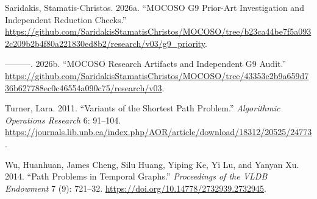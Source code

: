 \documentclass[
  11pt,
  letterpaper,
]{article}
\newlength{\cslhangindent}
\newlength{\cslentryspacingunit} %
\newenvironment{CSLReferences}[2] %
 {%
  \setlength{\parindent}{0pt}
  \ifodd #1
  \let\oldpar\par
  \def\par{\hangindent=\cslhangindent\oldpar}
  \fi
  \setlength{\parskip}{#2\cslentryspacingunit}
 }%
 {}
\begin{document}
\begin{CSLReferences}{1}{0}
\leavevmode{}%
Saridakis, Stamatis-Christos. 2026a. {``{MOCOSO G9} Prior-Art
Investigation and Independent Reduction Checks.''}
\url{https://github.com/SaridakisStamatisChristos/MOCOSO/tree/b23ca44be7f5a0932c209b2b4f80a221830ed8b2/research/v03/g9_priority}.

\leavevmode{}%
---------. 2026b. {``{MOCOSO} Research Artifacts and Independent {G9}
Audit.''}
\url{https://github.com/SaridakisStamatisChristos/MOCOSO/tree/43353e2b9a659d736b627788ec0c46554a090c75/research/v03}.

\leavevmode{}%
Turner, Lara. 2011. {``Variants of the Shortest Path Problem.''}
\emph{Algorithmic Operations Research} 6: 91--104.
\url{https://journals.lib.unb.ca/index.php/AOR/article/download/18312/20525/24773}.

\leavevmode{}%
Wu, Huanhuan, James Cheng, Silu Huang, Yiping Ke, Yi Lu, and Yanyan Xu.
2014. {``Path Problems in Temporal Graphs.''} \emph{Proceedings of the
VLDB Endowment} 7 (9): 721--32.
\url{https://doi.org/10.14778/2732939.2732945}.

\end{CSLReferences}
\end{document}
